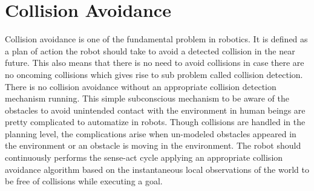 \section{Collision Avoidance}
Collision avoidance is one of the fundamental problem in robotics. It is defined as a plan of action the robot should take to avoid a detected collision in the near future. This also means that there is no need to avoid collisions in case there are no oncoming collisions which gives rise to sub problem called collision detection. There is no collision avoidance without an appropriate collision detection mechanism running. This simple subconscious mechanism to be aware of the obstacles to avoid unintended contact with the environment in human beings are pretty complicated to automatize in robots. Though collisions are handled in the planning level, the complications arise when un-modeled obstacles appeared in the environment or an obstacle is moving in the environment. The robot should continuously performs the sense-act cycle applying an appropriate collision avoidance algorithm based on the instantaneous local observations of the world to be free of collisions while executing a goal. 

